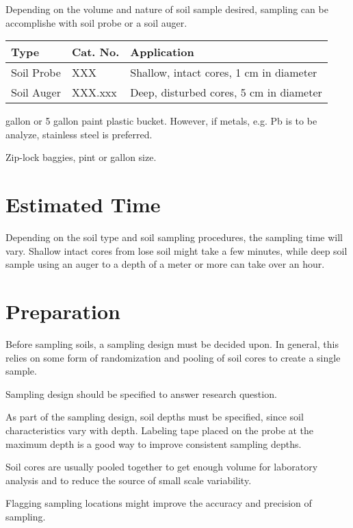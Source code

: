 \documentclass[12pt]{../SOP2}\usepackage[]{graphicx}\usepackage[]{xcolor}
\begin{document}
\NP Depending on the volume and nature of soil sample desired, sampling can be accomplishe with soil probe or a soil auger. 

\begin{table}[h]
\begin{tabular}{lll} \hline
Type      &     Cat. No.    &  Application \\ \hline\hline
Soil Probe  & XXX         & Shallow, intact cores, 1 cm in diameter \\
Soil Auger  & XXX.xxx     & Deep, disturbed cores, 5 cm in diameter \\ \hline

\end{tabular}
\end{table}

 gallon or 5 gallon paint plastic bucket. However, if metals, e.g. Pb is to be analyze, stainless steel is preferred.

\NP Zip-lock baggies, pint or gallon size.

\section{Estimated Time}

\NP Depending on the soil type and soil sampling procedures, the sampling time will vary. Shallow intact cores from lose soil might take a few minutes, while deep soil sample using an auger to a depth of a meter or more can take over an hour.

\section{Preparation}

\NP Before sampling soils, a sampling design must be decided upon. In general, this relies on some form of randomization and pooling of soil cores to create a single sample. 

\NP Sampling design should be specified to answer research question.

\NP As part of the sampling design, soil depths must be specified, since soil characteristics vary with depth. Labeling tape placed on the probe at the maximum depth is a good way to improve consistent sampling depths.

\NP Soil cores are usually pooled together to get enough volume for laboratory analysis and to reduce the source of small scale variability.

\NP Flagging sampling locations might improve the accuracy and precision of sampling.
\end{document}
